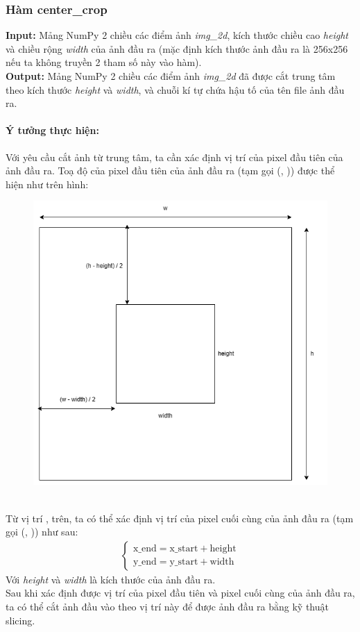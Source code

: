 \documentclass[]{article}
\begin{document}
\subsubsection{Hàm center\_crop}
\textbf{Input:} Mảng NumPy 2 chiều các điểm ảnh \textit{img\_2d}, kích thước chiều cao \textit{height} và chiều rộng \textit{width} của ảnh đầu ra (mặc định kích thước ảnh đầu ra là 256x256 nếu ta không truyền 2 tham số này vào hàm). \\
\textbf{Output:} Mảng NumPy 2 chiều các điểm ảnh \textit{img\_2d} đã được cắt trung tâm theo kích thước \textit{height} và \textit{width}, và chuỗi kí tự chứa hậu tố của tên file ảnh đầu ra. \\
\paragraph{Ý tưởng thực hiện:} Với yêu cầu cắt ảnh từ trung tâm, ta cần xác định vị trí của pixel đầu tiên của ảnh đầu ra. Toạ độ của pixel đầu tiên của ảnh đầu ra (tạm gọi (, )) được thể hiện như trên hình:
\begin{figure}[!ht]
\includegraphics[width = .5\textwidth]{image/square_center.png}
\end{figure} \\
Từ vị trí ,  trên, ta có thể xác định vị trí của pixel cuối cùng của ảnh đầu ra (tạm gọi (, )) như sau:
\begin{align*}
  \begin{cases}
    \text{x\_{end}} = \text{x\_{start}} + \text{height} \\
    \text{y\_{end}} = \text{y\_{start}} + \text{width}
  \end{cases}
\end{align*}
Với \textit{height} và \textit{width} là kích thước của ảnh đầu ra. \\
Sau khi xác định được vị trí của pixel đầu tiên và pixel cuối cùng của ảnh đầu ra, ta có thể cắt ảnh đầu vào theo vị trí này để được ảnh đầu ra bằng kỹ thuật slicing. 
\end{document}
